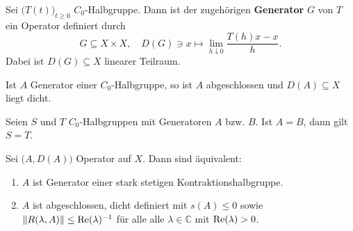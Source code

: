 \begin{defi}[Generator]
Sei $\big(T(t)\big)_{t\geq0}$ $C_0$-Halbgruppe. Dann ist  der zugehörigen \textbf{Generator} $G$ von $T$ ein Operator definiert durch 
\begin{equation}\label{eq:}
G\subseteq X\times X,\quad D(G)\ni x\mapsto \lim_{h\downarrow 0}\frac{T(h)x - x}{h}.
\end{equation}
Dabei  ist $D(G)\subseteq X$ linearer Teilraum.
\end{defi}

\begin{prop}\cite{}\label{Charakterisierung von Generatoren}
Ist $A$ Generator einer $C_0$-Halbgruppe, so ist $A$ abgeschlossen und $D(A)\subseteq X$ liegt dicht.
\end{prop}

\begin{prop}\cite{}\label{Eindeutigkeit der Halbgruppen identischer Generatoren}
Seien $S$ und $T$ $C_0$-Halbgruppen mit Generatoren $A$ bzw. $B$. Ist $A=B$, dann gilt $S = T$.
\end{prop}

\begin{fsatz}\cite{banasiak_arlotti_2006}\label{Satz von Hille-Yosida}
Sei $\big(A, D(A)\big)$ Operator auf $X$. Dann sind äquivalent:
\begin{enumerate}
\item $A$ ist Generator einer stark stetigen Kontraktionshalbgruppe.
\item $A$ ist abgeschlossen, dicht definiert mit $s(A)\leq 0$ sowie $\|R(\lambda, A)\|\leq \textnormal{Re}(\lambda)^{-1}$ für alle alle $\lambda\in \mathbb C$ mit $\textnormal{Re}(\lambda) > 0$.
\end{enumerate}
\end{fsatz}